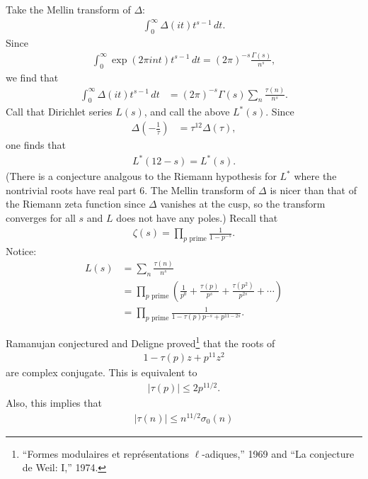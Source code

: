 \documentclass[11pt, oneside,margin=1in]{article}
\begin{document}
Take the Mellin transform of $\Delta$:
\begin{align*}
	\int_{0}^{\infty} \Delta(it) t^{s-1} \, dt. 
\end{align*}
Since
\begin{align*}
	\int_{0}^{\infty} \exp({2\pi i n t})t^{s-1}  \, dt = (2\pi)^{-s}  \frac{\Gamma(s)}{n^s}, 
\end{align*}
we find that
\begin{align*}
	\int_{0}^{\infty} \Delta(it) t^{s-1} \, dt	&=(2\pi)^{-s} \Gamma (s)  \sum_{n}^{} \frac{\tau(n)}{n^s}.	
\end{align*}
Call that Dirichlet series $L(s)$, and call the above $L^*(s)$. Since
\begin{align*}
	\Delta \left( -\frac{1}{\tau} \right) &= \tau^{12}\Delta(\tau),
\end{align*}
one finds that
\begin{align*}
	L^*(12-s) = L^* (s).
\end{align*}
(There is a conjecture analgous to the Riemann hypothesis for $L^*$ where the nontrivial roots have real part $6$. The Mellin transform of $\Delta$ is nicer than that of the Riemann zeta function since $\Delta$ vanishes at the cusp, so the transform converges for all $s$ and $L$ does not have any poles.) Recall that
 \begin{align*}
	\zeta(s) = \prod_{p \textrm{ prime}}  \frac{1}{1-p^{-s}}.
\end{align*}
Notice:
\begin{align*}
	L(s) &=  \sum_{n}^{} \frac{\tau(n)}{n^s}\\
	     &= \prod_{p\textrm { prime}} \left( \frac{1}{p^0} + \frac{\tau(p)}{p^s}  + \frac{\tau(p^2)}{p^{2s}} + \cdots \right)\\
	     &= \prod_{p\textrm{ prime}} \frac{1}{1-\tau(p)p^{-s} + p^{11-2s}}.
\end{align*}

Ramanujan conjectured and Deligne proved\footnote{``Formes modulaires et repr\'esentations $\ell$-adiques,'' 1969 and ``La conjecture de Weil: I,'' 1974.} that the roots of 
\begin{align*}
	1 - \tau(p) z + p^{11} z^2
\end{align*}
are complex conjugate. This is equivalent to
\begin{align*}
	\left\lvert \tau(p) \right\rvert \le 2p^{11/2}.
\end{align*}
Also, this implies that
\begin{align*}
	\left\lvert \tau(n) \right\rvert \le n^{11/2}\sigma_0 (n)
\end{align*}
\end{document}
